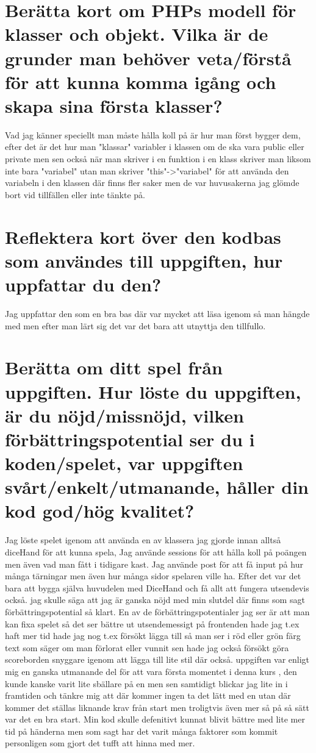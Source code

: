 \documentclass[oneside]{book}
\begin{document}
\section{Berätta kort om PHPs modell för klasser och objekt. Vilka är de grunder man behöver veta/förstå för att kunna komma igång och skapa sina första klasser?}

Vad jag känner speciellt man måste hålla koll på är hur man först bygger dem, efter det är det hur man "klassar" variabler
i klassen om de ska vara public eller private men sen också när man skriver i en funktion i en klass skriver man liksom inte
bara "variabel" utan man skriver "this"->"variabel" för att använda den variabeln i den klassen
där finns fler saker men de var huvusakerna jag glömde bort vid tillfällen eller inte tänkte på.

\section{Reflektera kort över den kodbas som användes till uppgiften, hur uppfattar du den?}
Jag uppfattar den som en bra bas där var mycket att läsa igenom så man hängde med men efter man lärt sig
det var det bara att utnyttja den tillfullo.

\section{Berätta om ditt spel från uppgiften. Hur löste du uppgiften, är du nöjd/missnöjd,
    vilken förbättringspotential ser du i koden/spelet,
    var uppgiften svårt/enkelt/utmanande, håller din kod god/hög kvalitet?}

Jag löste spelet igenom att använda en av klassera jag gjorde innan alltså diceHand för att kunna spela, Jag använde sessions för att
hålla koll på poängen men även vad man fått i tidigare kast. Jag använde post för att få input på hur många tärningar men även hur många
sidor spelaren ville ha. Efter det var det bara att bygga själva huvudelen med DiceHand och få allt att fungera utsendevis också. jag
skulle säga att jag är ganska nöjd med min slutdel där finns som sagt förbättringspotential så klart. En av de förbättringspotentialer
jag ser är att man kan fixa spelet så det ser bättre ut utsendemessigt på frontenden hade jag t.ex haft mer tid hade jag nog t.ex 
försökt lägga till så man ser i röd eller grön färg text som säger om man förlorat eller vunnit sen hade jag också försökt göra scoreborden
snyggare igenom att lägga till lite stil där också. uppgiften var enligt mig en ganska utmanande del för att vara första momentet i denna kurs
, den kunde kanske varit lite sbällare på en men sen samtidigt blickar jag lite in i framtiden och tänkre mig att där kommer ingen ta det lätt
med en utan där kommer det ställas liknande krav från start men troligtvis även mer så på så sätt var det en bra start. Min kod skulle
defenitivt kunnat blivit bättre med lite mer tid på händerna men som sagt har det varit många faktorer som kommit personligen som gjort det tufft
att hinna med mer.
\end{document}
